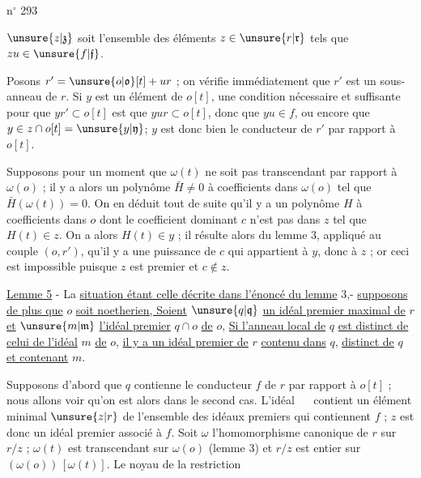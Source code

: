 \hfill n$^\circ$ 293

$\unsure{z|\mathfrak z}$ soit l'ensemble des éléments $z\in\unsure{r|\mathfrak r}$ tels que $zu\in\unsure{f|\mathfrak f}$.

Posons $r'=\unsure{o|\mathfrak o}[t]+ur$ ; on vérifie immédiatement que $r'$ est un sous-anneau de $r$. Si $y$ est un élément de $o[t]$, une condition nécessaire et suffisante pour que $yr'\subset o[t]$ est que $yur\subset o[t]$, donc que $yu\in f$, ou encore que $y\in z\cap o[t]=\unsure{y|\mathfrak y}$; $y$ est donc bien le conducteur de $r'$ par rapport à $o[t]$.

Supposons pour un moment que $\omega(t)$ ne soit pas transcendant par rapport à $\omega(o)$ ; il y a alors un polynôme $\bar H\ne0$ à coefficients dans $\omega(o)$ tel que $\bar H(\omega(t))=0$. On en déduit tout de suite qu'il y a un polynôme $H$ à coefficients dans $o$ dont le coefficient dominant $c$ n'est pas dans $z$ tel que $H(t)\in z$. On a alors $H(t)\in y$ ; il résulte alors du lemme 3, appliqué au couple $(o,r')$, qu'il y a une puissance de $c$ qui appartient à $y$, donc à $z$ ; or ceci est impossible puisque $z$ est premier et $c\notin z$.

\uline{Lemme 5} - La \uline{situation étant celle décrite dans l'énoncé du lemme} 3,- \uline{supposons de plus que} $o$ \uline{soit noetherien, Soient} $\unsure{q|\mathfrak q}$ \uline{un idéal premier maximal de} $r$ \uline{et} $\unsure{m|\mathfrak m}$ \uline{l'idéal premier} $q\cap o$ \uline{de} $o$, \uline{Si l'anneau local de} $q$ \uline{est distinct de celui de l'idéal} $m$ \uline{de} $o$, \uline{il y a un idéal premier de} $r$ \uline{contenu dans} $q$, \uline{distinct de} $q$ \uline{et contenant} $m$.

Supposons d'abord que $q$ contienne le conducteur $f$ de $r$ par rapport à $o[t]$ ; nous allons voir qu'on est alors dans le second cas. L'idéal $\quad$ contient un élément minimal $\unsure{z|r}$ de l'ensemble des idéaux premiers qui contiennent $f$ ; $z$ est donc un idéal premier associé à $f$. Soit $\omega$ l'homomorphisme canonique de $r$ sur $r/z$ ; $\omega(t)$ est transcendant sur $\omega(o)$ (lemme 3) et $r/z$ est entier sur $(\omega(o))\,[\omega(t)]$. Le noyau de la restriction

